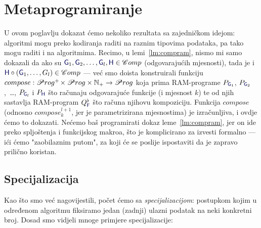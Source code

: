 \chapter{Metaprogramiranje}

U ovom poglavlju dokazat ćemo nekoliko rezultata sa zajedničkom idejom: algoritmi mogu preko kodiranja raditi na raznim tipovima podataka, pa tako mogu raditi i na algoritmima. Recimo, u lemi~\ref{lm:compram}, nismo mi samo dokazali da ako su $\f G_1,\f G_2,\dotsc,\f G_l,\f H\in\mathscr Comp$ (odgovarajućih mjesnosti), tada je i $\f H\circ(\f G_1,\dotsc,G_l)\in\mathscr Comp$ --- već smo doista konstruirali funkciju $compose:\mathscr Prog^+\mspace{-2mu}\times\mathscr Prog\times{\mathbb N}_+\to\mathscr Prog$ koja prima RAM-programe $P_{\f G_1}$, $P_{\f G_2}$,~\ldots, $P_{\f G_l}$ i $P_{\f H}$ što računaju odgovarajuće funkcije (i mjesnost $k$) te od njih sastavlja RAM-program $Q_{\f F}^\flat$ što računa njihovu kompoziciju. Funkcija $compose$ (odnosno $compose_k^{l+1}\!$, jer je parametrizirana mjesnostima) je izračunljiva, i ovdje ćemo to dokazati. Nećemo baš programirati dokaz leme~\ref{lm:compram}, jer on ide preko spljoštenja i funkcijskog makroa, što je komplicirano za izvesti formalno --- ići ćemo "zaobilaznim putom", za koji će se poslije ispostaviti da je zapravo prilično koristan.

\section{Specijalizacija}

Kao što smo već nagovijestili, počet ćemo sa \emph{specijalizacijom}: postupkom kojim u od\-re\-đe\-nom algoritmu fiksiramo jedan (zadnji) ulazni podatak na neki konkretni broj. Dosad smo vidjeli mnoge primjere specijalizacije:

